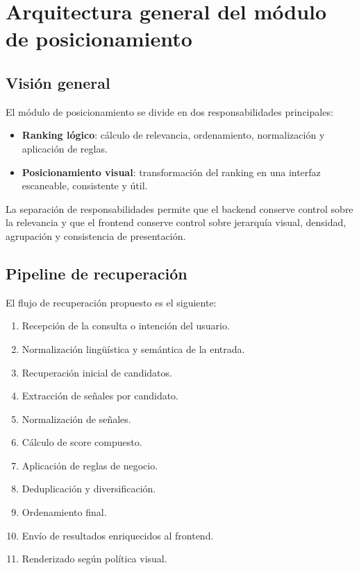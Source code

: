 \documentclass[12pt,a4paper]{article}
\begin{document}
\section{Arquitectura general del módulo de posicionamiento}

\subsection{Visión general}

El módulo de posicionamiento se divide en dos responsabilidades principales:

\begin{itemize}[noitemsep]
    \item \textbf{Ranking lógico}: cálculo de relevancia, ordenamiento, normalización y aplicación de reglas.
    \item \textbf{Posicionamiento visual}: transformación del ranking en una interfaz escaneable, consistente y útil.
\end{itemize}

La separación de responsabilidades permite que el backend conserve control sobre la relevancia y que el frontend conserve control sobre jerarquía visual, densidad, agrupación y consistencia de presentación.

\subsection{Pipeline de recuperación}

El flujo de recuperación propuesto es el siguiente:

\begin{enumerate}[noitemsep]
    \item Recepción de la consulta o intención del usuario.
    \item Normalización lingüística y semántica de la entrada.
    \item Recuperación inicial de candidatos.
    \item Extracción de señales por candidato.
    \item Normalización de señales.
    \item Cálculo de score compuesto.
    \item Aplicación de reglas de negocio.
    \item Deduplicación y diversificación.
    \item Ordenamiento final.
    \item Envío de resultados enriquecidos al frontend.
    \item Renderizado según política visual.
\end{enumerate}
\end{document}
